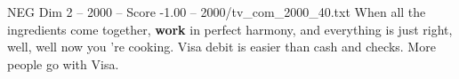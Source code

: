 \begin{textsample}{NEG Dim 2 – 2000 – Score -1.00 – 2000/tv\_com\_2000\_40.txt}  \label{ex:f2_neg_020}
When all the ingredients come together, \textbf{work} in perfect harmony, and everything is just right, well, well now you 're cooking.
Visa debit is easier than cash and checks.
More people go with Visa.

\end{textsample}
